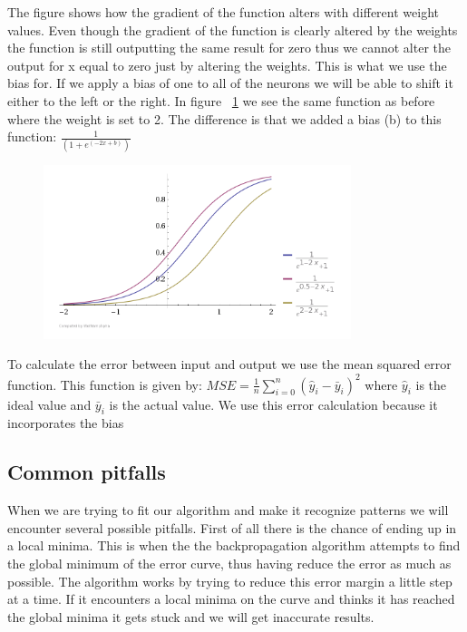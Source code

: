 The figure shows how the gradient of the function alters with different weight values. Even though the gradient of the function is clearly altered by the weights the function is still outputting the same result for zero thus we cannot alter the output for x equal to zero just by altering the weights. This is what we use the bias for. If we apply a bias of one to all of the neurons we will be able to shift it either to the left or the right. In figure ~\ref{fig:activationFunctionsWithBias} we see the same function as before where the weight is set to 2. The difference is that we added a bias (b) to this function: \begin{math} \frac{1}{(1+e^{(-2x+b)})} \end{math} \cite[p. 165]{rojas1996neural} \cite{inductiveBias}

\begin{figure}[h!]
\centering
\includegraphics[width=0.8\textwidth ,natwidth=410,natheight=237]{billeder/ActivationFunctionsWithBias.png}
\caption{}
\label{fig:activationFunctionsWithBias}
\end{figure}

To calculate the error between input and output we use the mean squared error function. This function is given by: \begin{math} MSE=\frac{1}{n}\sum_{i=0}^{n}(\hat{y}_i-\bar{y}_i)^2 \end{math} where \begin{math} \hat{y}_i \end{math} is the ideal value and \begin{math} \bar{y}_i \end{math} is the actual value. We use this error calculation because it incorporates the bias \cite{meanSquaredError}

\subsection{Common pitfalls}
When we are trying to fit our algorithm and make it recognize patterns we will encounter several possible pitfalls. First of all there is the chance of ending up in a local minima. This is when the the backpropagation algorithm attempts to find the global minimum of the error curve, thus having reduce the error as much as possible. The algorithm works by trying to reduce this error margin a little step at a time. If it encounters a local minima on the curve and thinks it has reached the global minima it gets stuck and we will get inaccurate results. 

